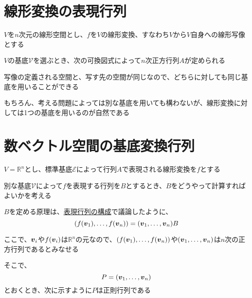 \documentclass[../../../topic_linear-algebra]{subfiles}
\begin{document}
\sectionline
\section{線形変換の表現行列}

$V$を$n$次元の線形空間とし、$f$を$V$の線形変換、すなわち$V$から$V$自身への線形写像とする

$V$の基底$\mathcal{V}$を選ぶとき、次の可換図式によって$n$次正方行列$A$が定められる
\begin{center}
\end{center}

写像の定義される空間と、写す先の空間が同じなので、どちらに対しても同じ基底を用いることができる

\br

もちろん、考える問題によっては別な基底を用いても構わないが、線形変換に対しては1つの基底を用いるのが自然である

\sectionline
\section{数ベクトル空間の基底変換行列}

$V = \mathbb{R}^n$とし、標準基底$\mathcal{E}$によって行列$A$で表現される線形変換を$f$とする

別な基底$\mathcal{V}$によって$f$を表現する行列を$B$とするとき、$B$をどうやって計算すればよいかを考える

\br

$B$を定める原理は、\hyperref[sec:construction-of-matrix-rep]{表現行列の構成}で議論したように、
\begin{equation*}
  (f(\vb*{v}_1), \ldots, f(\vb*{v}_n)) = (\vb*{v}_1, \ldots, \vb*{v}_n) B
\end{equation*}

ここで、$\vb*{v}_i$や$f(\vb*{v}_i)$は$\mathbb{R}^n$の元なので、$(f(\vb*{v}_1), \ldots, f(\vb*{v}_n))$や$(\vb*{v}_1, \ldots, \vb*{v}_n)$は$n$次の正方行列であるとみなせる

そこで、
\begin{equation*}
  P = (\vb*{v}_1, \ldots, \vb*{v}_n)
\end{equation*}
とおくとき、次に示すように$P$は正則行列である
\end{document}
